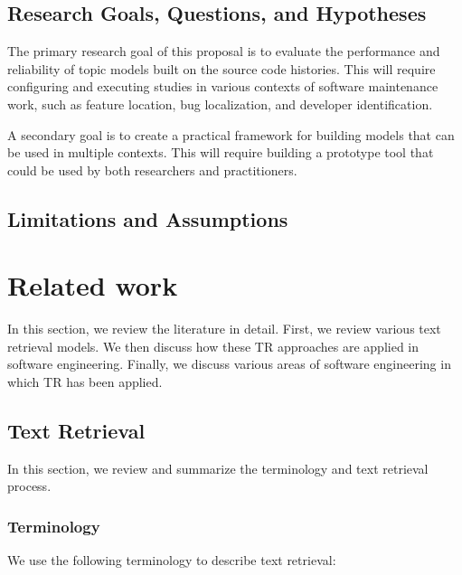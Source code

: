 \documentclass[12pt,draft]{Manuscript}
\begin{document}
\begin{body}
\section{Research Goals, Questions, and
Hypotheses}\label{research-goals-questions-and-hypotheses}

The primary research goal of this proposal is to evaluate the
performance and reliability of topic models built on the source code
histories. This will require configuring and executing studies in
various contexts of software maintenance work, such as feature location,
bug localization, and developer identification.

A secondary goal is to create a practical framework for building models
that can be used in multiple contexts. This will require building a
prototype tool that could be used by both researchers and practitioners.

\section{Limitations and Assumptions}\label{limitations-and-assumptions}

\chapter{Related work}\label{related-work}

In this section, we review the literature in detail. First, we review
various text retrieval models. We then discuss how these TR approaches
are applied in software engineering. Finally, we discuss various areas
of software engineering in which TR has been applied.

\section{Text Retrieval}\label{related-general-TR}

In this section, we review and summarize the terminology and text
retrieval process.

\subsection{Terminology}\label{terminology}

We use the following terminology to describe text retrieval:


\end{body}
\end{document}
